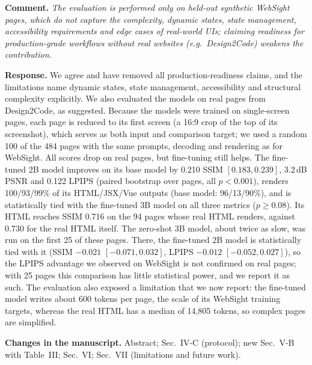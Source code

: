 \documentclass[11pt,a4paper]{article}
\newcommand{\rev}[1]{\par\noindent\textbf{Comment.} \textit{#1}\par}
\newcommand{\resp}{\par\noindent\textbf{Response.} }
\newcommand{\change}[1]{\par\noindent\textbf{Changes in the manuscript.} #1\par\medskip}
\begin{document}
\rev{The evaluation is performed only on held-out synthetic WebSight pages, which
do not capture the complexity, dynamic states, state management, accessibility
requirements and edge cases of real-world UIs; claiming readiness for
production-grade workflows without real websites (e.g.\ Design2Code) weakens the
contribution.}
\resp We agree and have removed all production-readiness claims, and the
limitations name dynamic states, state management, accessibility and structural
complexity explicitly. We also evaluated the models on real pages from
Design2Code, as suggested. Because the models were trained on single-screen
pages, each page is reduced to its first screen (a 16:9 crop of the top of its
screenshot), which serves as both input and comparison target; we used a random
100 of the 484 pages with the same prompts, decoding and rendering as for
WebSight. All scores drop on real pages, but fine-tuning still helps. The
fine-tuned 2B model improves on its base model by 0.210 SSIM $[0.183, 0.239]$,
3.2\,dB PSNR and 0.122 LPIPS (paired bootstrap over pages, all $p<0.001$),
renders 100/93/99\% of its HTML/JSX/Vue outputs (base model: 96/13/90\%), and is
statistically tied with the fine-tuned 3B model on all three metrics
($p \ge 0.08$). Its HTML reaches SSIM 0.716 on the 94 pages whose real HTML
renders, against 0.730 for the real HTML itself. The zero-shot 3B model, about
twice as slow, was run on the first 25 of these pages. There, the fine-tuned 2B
model is statistically tied with it (SSIM $-0.021$ $[-0.071, 0.032]$, LPIPS
$-0.012$ $[-0.052, 0.027]$), so the LPIPS advantage we observed on WebSight is
not confirmed on real pages; with 25 pages this comparison has little
statistical power, and we report it as such.
The evaluation also exposed a limitation that we now report: the fine-tuned
model writes about 600 tokens per page, the scale of its WebSight training
targets, whereas the real HTML has a median of 14,805 tokens, so complex pages
are simplified.
\change{Abstract; Sec.~IV-C (protocol); new Sec.~V-B with Table~III; Sec.~VI;
Sec.~VII (limitations and future work).}
\end{document}
